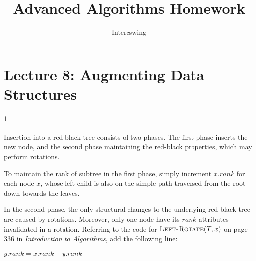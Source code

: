 \documentclass{article}
\title{Advanced Algorithms Homework}
\author{Intereswing}
\begin{document}
\maketitle

\section{Lecture 8: Augmenting Data Structures}
\paragraph{1}

Insertion into a red-black tree consists of two phases. The first phase inserts the new node, and the second phase maintaining the red-black properties, which may perform rotations. 

To maintain the rank of subtree in the first phase, simply increment $x.rank$ for each node $x$, whose left child is also on the simple path traversed from the root down towards the leaves.

In the second phase, the only structural changes to the underlying red-black tree are caused by rotations. Moreover, only one node have its $rank$ attributes invalidated in a rotation. Referring to the code for $\textsc{Left-Rotate}(T,x)$ on page 336 in \textit{Introduction to Algorithms}, add the following line:

\addtocounter{algorithm}{1}
\begin{algorithm}
\begin{algorithmic}[1]
	\STATE \(y.rank = x.rank + y.rank\)
\end{algorithmic}
\end{algorithm}
\end{document}
